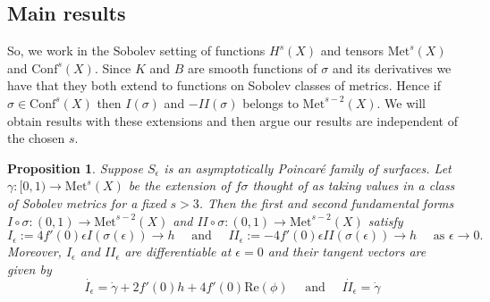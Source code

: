 \documentclass{amsart}
\newtheorem{prop}[thm]{Proposition}
\newcommand{\two}{I\!\!I}
\begin{document}
\subsection{Main results}



So, we work in the Sobolev setting of functions $H^s(X)$ and tensors $\mathrm{Met}^s(X)$ and $\mathrm{Conf}^s(X)$.
Since $K$ and $B$ are smooth functions of $\sigma$ and its derivatives we have that they both extend to functions on Sobolev classes of metrics.
Hence if $\sigma \in \mathrm{Conf}^s(X)$ then $I(\sigma)$ and $-\two(\sigma)$ belongs to $\mathrm{Met}^{s-2}(X)$.
We will obtain results with these extensions and then argue our results are independent of the chosen $s$. 



\begin{prop}
\label{thm-in-sobolev}
Suppose $S_\epsilon$ is an asymptotically Poincar\'e family of surfaces. 
Let $\gamma : [0,1) \to \mathrm{Met}^s(X)$ be the extension of $f\sigma$ thought of as taking values in a class of Sobolev metrics for a fixed $s > 3$. 
Then the first and second fundamental forms $I \circ \sigma: (0,1) \to \mathrm{Met}^{s-2}(X)$ and  $\two \circ \sigma: (0,1) \to \mathrm{Met}^{s-2}(X)$ satisfy
\[
I_\epsilon := 4 f'(0) \epsilon I(\sigma(\epsilon)) \to h
\quad \text{ and } \quad
\two_\epsilon :=  - 4 f'(0) \epsilon \two(\sigma(\epsilon)) \to h
\quad \text{ as } \epsilon \to 0.
\]
Moreover, $I_\epsilon$ and $\two_\epsilon$ are differentiable at $\epsilon = 0$ and their tangent vectors are given by 
\[
\dot{I_\epsilon} = \dot{\gamma} + 2 f'(0) h + 4 f'(0) \mathrm{Re}(\phi)
\quad \text{ and } \quad
\dot{\two_\epsilon} = \dot{\gamma}
\]
\end{prop}
\end{document}
